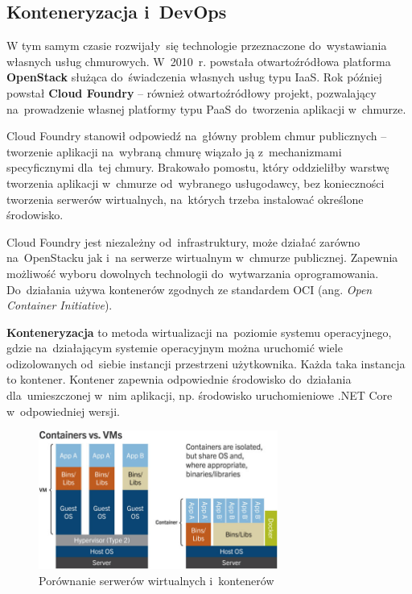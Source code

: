\documentclass[12pt,a4paper,twoside,titlepage,openright]{book}
\begin{document}
\subsection{Konteneryzacja i~DevOps} \label{section:konteneryzacja}

W tym samym czasie rozwijały~się technologie przeznaczone do~wystawiania własnych usług chmurowych. W~2010~r. powstała otwartoźródłowa platforma \textbf{OpenStack} służąca do~świadczenia własnych usług typu IaaS. Rok później powstał \textbf{Cloud Foundry} -- również otwartoźródłowy projekt, pozwalający na~prowadzenie własnej platformy typu PaaS do~tworzenia aplikacji w~chmurze. 

Cloud Foundry stanowił odpowiedź na~główny problem chmur publicznych -- tworzenie aplikacji na~wybraną chmurę wiązało ją z~mechanizmami specyficznymi dla~tej chmury. Brakowało pomostu, który oddzieliłby warstwę tworzenia aplikacji w~chmurze od~wybranego usługodawcy, bez konieczności tworzenia serwerów wirtualnych, na~których trzeba instalować określone środowisko. \cite{cloudFoundry}

Cloud Foundry jest niezależny od~infrastruktury, może działać zarówno na~OpenStacku jak i~na serwerze wirtualnym w~chmurze publicznej. Zapewnia możliwość wyboru dowolnych technologii do~wytwarzania oprogramowania. Do~działania używa kontenerów zgodnych ze standardem OCI (ang. \textit{Open Container Initiative}). \cite{cloudFoundry} 

\textbf{Konteneryzacja} to metoda wirtualizacji na~poziomie systemu operacyjnego, gdzie na~działającym systemie operacyjnym można uruchomić wiele odizolowanych od~siebie instancji przestrzeni użytkownika. Każda taka instancja to kontener. Kontener zapewnia odpowiednie środowisko do~działania dla~umieszczonej w~nim aplikacji, np. środowisko uruchomieniowe .NET Core w~odpowiedniej wersji.  \cite{cloudFoundry,ccSpringer}

\begin{figure}[h]
	\centering
			\includegraphics[width=0.7\textwidth]{containers-vs-vms.png}
		\caption{Porównanie serwerów wirtualnych i~kontenerów \cite{ccSpringer}}
		\label{fig:containers-vs-vms}
\end{figure}
\end{document}
